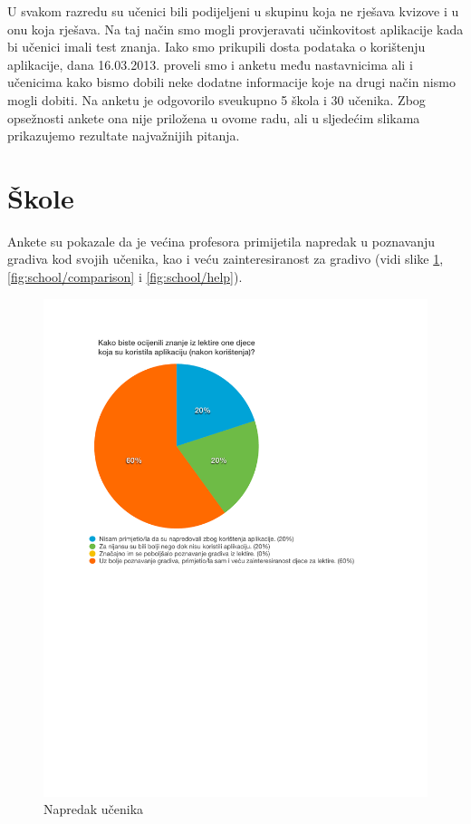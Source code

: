 \documentclass[11pt]{scrreprt}
\begin{document}
U svakom razredu su učenici bili podijeljeni u skupinu koja ne rješava kvizove
i u onu koja rješava. Na taj način smo mogli provjeravati učinkovitost
aplikacije kada bi učenici imali test znanja. Iako smo prikupili dosta podataka
o korištenju aplikacije, dana 16.03.2013. proveli smo i anketu među nastavnicima
ali i učenicima kako bismo dobili neke dodatne informacije koje na drugi način
nismo mogli dobiti. Na anketu je odgovorilo sveukupno 5 škola i 30 učenika.
Zbog opsežnosti ankete ona nije priložena u ovome radu, ali u sljedećim
slikama prikazujemo rezultate najvažnijih pitanja.

\section{Škole}

Ankete su pokazale da je većina profesora primijetila napredak u
poznavanju gradiva kod svojih učenika, kao i veću zainteresiranost za gradivo
(vidi slike \ref{fig:school/advance}, \ref{fig:school/comparison} i
\ref{fig:school/help}).

\begin{figure}[H]
  \centering
  \includegraphics{school/advance}
  \caption{Napredak učenika}
  \label{fig:school/advance}
\end{figure}
\end{document}
